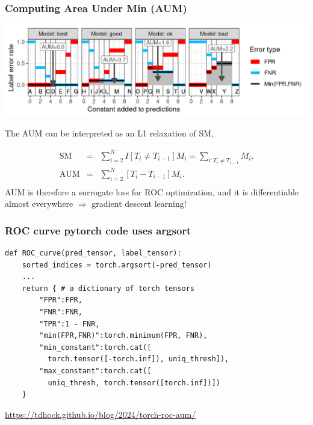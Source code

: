 \documentclass[t]{beamer}
\begin{document}
\begin{frame}
  \frametitle{Computing Area Under Min (AUM)}
  \includegraphics[width=\textwidth]{figure-more-than-one-new-binary-aum-rate}

The AUM can be interpreted as an L1 relaxation of SM,

\begin{eqnarray*}
    \text{SM} &=&
    \sum_{i=2}^{N}
    I[ T_{i} \neq T_{i-1} ]
    M_i =
    \sum_{i:T_{i} \neq T_{i-1} }
                  M_i.
                                    \\
    \text{AUM} &=&
    \sum_{i=2}^{N}
    [ T_{i} - T_{i-1} ]
                   M_i.\\
\end{eqnarray*}
AUM is therefore a surrogate loss for ROC optimization, and it is differentiable almost everywhere $\Rightarrow$ gradient descent learning!
\end{frame}

\begin{frame}[fragile]
  \frametitle{ROC curve pytorch code uses argsort}
  \begin{verbatim}
def ROC_curve(pred_tensor, label_tensor):
    sorted_indices = torch.argsort(-pred_tensor)
    ...
    return { # a dictionary of torch tensors
        "FPR":FPR,
        "FNR":FNR,
        "TPR":1 - FNR,
        "min(FPR,FNR)":torch.minimum(FPR, FNR),
        "min_constant":torch.cat([
          torch.tensor([-torch.inf]), uniq_thresh]),
        "max_constant":torch.cat([
          uniq_thresh, torch.tensor([torch.inf])])
    }
\end{verbatim}

    \url{https://tdhock.github.io/blog/2024/torch-roc-aum/}

\end{frame}
\end{document}
